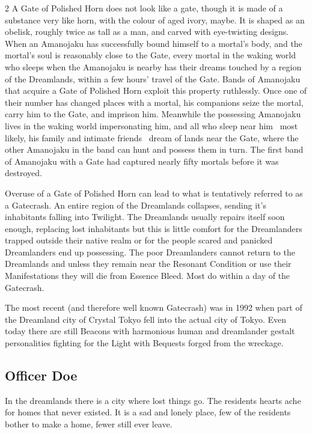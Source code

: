 \begin{multicols}{2}
A Gate of Polished Horn does not look like a gate, though it is made of a substance very like horn, with the colour of aged ivory, maybe. It is shaped as an obelisk, roughly twice as tall as a man, and carved with eye-twisting designs. When an Amanojaku has successfully bound himself to a mortal's body, and the mortal's soul is reasonably close to the Gate, every mortal in the waking world who sleeps when the Amanojaku is nearby has their dreams touched by a region of the Dreamlands, within a few hours' travel of the Gate.  Bands of Amanojaku that acquire a Gate of Polished Horn exploit this property ruthlessly.  Once one of their number has changed places with a mortal, his companions seize the mortal, carry him to the Gate, and imprison him.  Meanwhile the possessing Amanojaku lives in the waking world impersonating him, and all who sleep near him \textendash\, most likely, his family and intimate friends \textendash\, dream of lands near the Gate, where the other Amanojaku in the band can hunt and possess 
them  in turn.  The first band of Amanojaku with a Gate had captured nearly fifty mortals before it was destroyed. 

Overuse of a Gate of Polished Horn can lead to what is tentatively referred to as a Gatecrash. An entire region of the Dreamlands collapses, sending it's inhabitants falling into Twilight. The Dreamlands usually repairs itself soon enough, replacing lost inhabitants but this is little comfort for the Dreamlanders trapped outside their native realm or for the people scared and panicked Dreamlanders end up possessing. The poor Dreamlanders cannot return to the Dreamlands and unless they remain near the Resonant Condition or use their Manifestations they will die from Essence Bleed. Most do within a day of the Gatecrash. 

The most recent (and therefore well known Gatecrash) was in 1992 when part of the Dreamland city of Crystal Tokyo fell into the actual city of Tokyo. Even today there are still Beacons with harmonious human and dreamlander gestalt personalities fighting for the Light with Bequests forged from the wreckage. 

\subsection*{Officer Doe}

In the dreamlands there is a city where lost things go. The residents hearts ache for homes that never existed. It is a sad and lonely place, few of the residents bother to make a home, fewer still ever leave. 


\end{multicols}
